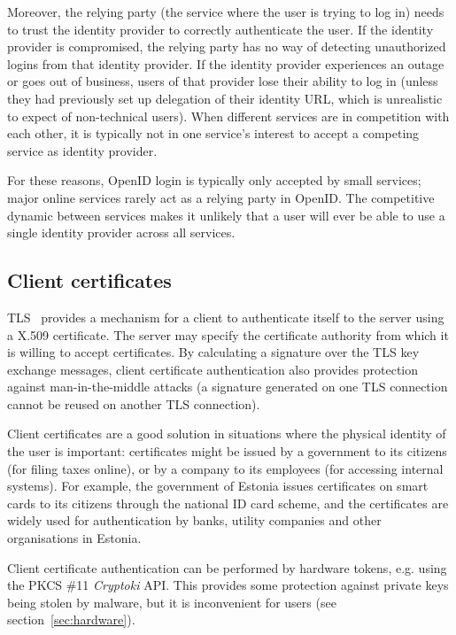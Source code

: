 Moreover, the relying party (the service where the user is trying to log in) needs to trust the
identity provider to correctly authenticate the user.  If the identity provider is compromised, the
relying party has no way of detecting unauthorized logins from that identity provider. If the
identity provider experiences an outage or goes out of business, users of that provider lose their
ability to log in (unless they had previously set up delegation of their identity URL, which is
unrealistic to expect of non-technical users). When different services are in competition with each
other, it is typically not in one service's interest to accept a competing service as identity
provider.

For these reasons, OpenID login is typically only accepted by small services; major online services
rarely act as a relying party in OpenID. The competitive dynamic between services makes it unlikely
that a user will ever be able to use a single identity provider across all services.

\subsection{Client certificates}\label{sec:clientcerts}

TLS~\cite{TLS} provides a mechanism for a client to authenticate itself to the server using a X.509
certificate. The server may specify the certificate authority from which it is willing to accept
certificates. By calculating a signature over the TLS key exchange messages, client certificate
authentication also provides protection against man-in-the-middle attacks (a signature generated on
one TLS connection cannot be reused on another TLS connection).

Client certificates are a good solution in situations where the physical identity of the user is
important: certificates might be issued by a government to its citizens (for filing taxes online),
or by a company to its employees (for accessing internal systems). For example, the government of
Estonia issues certificates on smart cards to its citizens through the national ID card scheme, and
the certificates are widely used for authentication by banks, utility companies and other
organisations in Estonia.~\cite{Parsovs14}

Client certificate authentication can be performed by hardware tokens, e.g. using the PKCS \#11
\emph{Cryptoki} API. This provides some protection against private keys being stolen by malware, but
it is inconvenient for users (see section~\ref{sec:hardware}).

